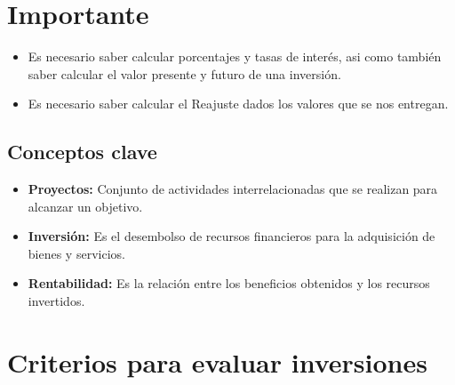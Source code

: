 \documentclass{templateNote}
\begin{document}


\portada
\margenes 
\tableofcontents
\newpage

\section*{Importante}

\begin{itemize}
    \item Es necesario saber calcular porcentajes y tasas de interés, asi como también saber calcular el valor presente y futuro de una inversión.
    \item Es necesario saber calcular el Reajuste dados los valores que se nos entregan.
\end{itemize}

\subsection*{Conceptos clave}

\begin{itemize}
    \item \textbf{Proyectos:} Conjunto de actividades interrelacionadas que se realizan para alcanzar un objetivo.
    \item \textbf{Inversión:} Es el desembolso de recursos financieros para la adquisición de bienes y servicios.
    \item \textbf{Rentabilidad:} Es la relación entre los beneficios obtenidos y los recursos invertidos.
\end{itemize}

\newpage
\section{Criterios para evaluar inversiones}
\end{document}
